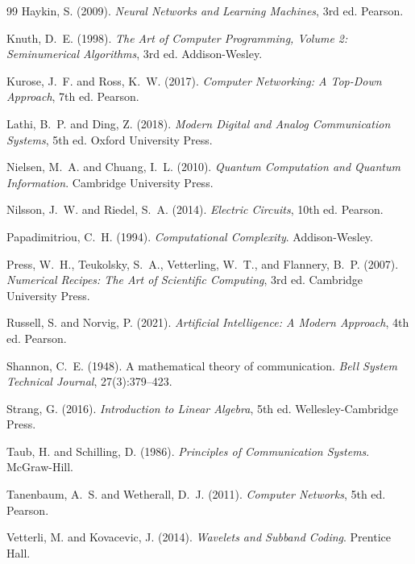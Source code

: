 \documentclass[12pt, a4paper]{article}
\theoremstyle{definition}
\theoremstyle{remark}
\begin{document}
\begin{thebibliography}{99}
Haykin, S. (2009).
\newblock \textit{Neural Networks and Learning Machines}, 3rd ed.
\newblock Pearson.

Knuth, D.~E. (1998).
\newblock \textit{The Art of Computer Programming, Volume 2: Seminumerical Algorithms}, 3rd ed.
\newblock Addison-Wesley.

Kurose, J.~F. and Ross, K.~W. (2017).
\newblock \textit{Computer Networking: A Top-Down Approach}, 7th ed.
\newblock Pearson.

Lathi, B.~P. and Ding, Z. (2018).
\newblock \textit{Modern Digital and Analog Communication Systems}, 5th ed.
\newblock Oxford University Press.

Nielsen, M.~A. and Chuang, I.~L. (2010).
\newblock \textit{Quantum Computation and Quantum Information}.
\newblock Cambridge University Press.

Nilsson, J.~W. and Riedel, S.~A. (2014).
\newblock \textit{Electric Circuits}, 10th ed.
\newblock Pearson.

Papadimitriou, C.~H. (1994).
\newblock \textit{Computational Complexity}.
\newblock Addison-Wesley.

Press, W.~H., Teukolsky, S.~A., Vetterling, W.~T., and Flannery, B.~P. (2007).
\newblock \textit{Numerical Recipes: The Art of Scientific Computing}, 3rd ed.
\newblock Cambridge University Press.

Russell, S. and Norvig, P. (2021).
\newblock \textit{Artificial Intelligence: A Modern Approach}, 4th ed.
\newblock Pearson.

Shannon, C.~E. (1948).
\newblock A mathematical theory of communication.
\newblock \textit{Bell System Technical Journal}, 27(3):379--423.

Strang, G. (2016).
\newblock \textit{Introduction to Linear Algebra}, 5th ed.
\newblock Wellesley-Cambridge Press.

Taub, H. and Schilling, D. (1986).
\newblock \textit{Principles of Communication Systems}.
\newblock McGraw-Hill.

Tanenbaum, A.~S. and Wetherall, D.~J. (2011).
\newblock \textit{Computer Networks}, 5th ed.
\newblock Pearson.

Vetterli, M. and Kovacevic, J. (2014).
\newblock \textit{Wavelets and Subband Coding}.
\newblock Prentice Hall.

\end{thebibliography}
\end{document}
